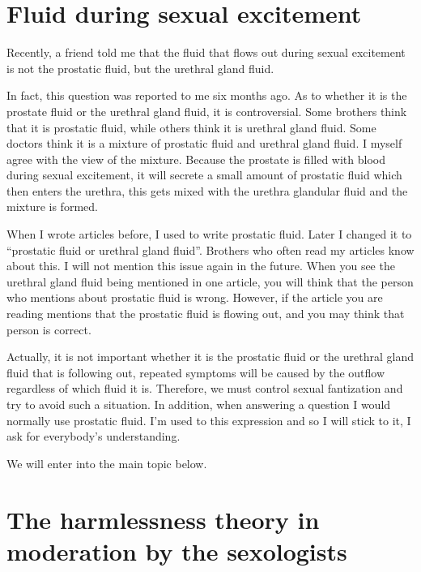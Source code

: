\documentclass[
]{book}
\begin{document}
\hypertarget{fluid-during-sexual-excitement}{%
\section{Fluid during sexual excitement}\label{fluid-during-sexual-excitement}}

Recently, a friend told me that the fluid that flows out during sexual excitement is not the prostatic fluid, but the urethral gland fluid.

In fact, this question was reported to me six months ago. As to whether it is the prostate fluid or the urethral gland fluid, it is controversial. Some brothers think that it is prostatic fluid, while others think it is urethral gland fluid. Some doctors think it is a mixture of prostatic fluid and urethral gland fluid. I myself agree with the view of the mixture. Because the prostate is filled with blood during sexual excitement, it will secrete a small amount of prostatic fluid which then enters the urethra, this gets mixed with the urethra glandular fluid and the mixture is formed.

When I wrote articles before, I used to write prostatic fluid. Later I changed it to ``prostatic fluid or urethral gland fluid''. Brothers who often read my articles know about this. I will not mention this issue again in the future. When you see the urethral gland fluid being mentioned in one article, you will think that the person who mentions about prostatic fluid is wrong. However, if the article you are reading mentions that the prostatic fluid is flowing out, and you may think that person is correct.

Actually, it is not important whether it is the prostatic fluid or the urethral gland fluid that is following out, repeated symptoms will be caused by the outflow regardless of which fluid it is. Therefore, we must control sexual fantization and try to avoid such a situation. In addition, when answering a question I would normally use prostatic fluid. I'm used to this expression and so I will stick to it, I ask for everybody's understanding.

We will enter into the main topic below.

\hypertarget{the-harmlessness-theory-in-moderation-by-the-sexologists}{%
\section{The harmlessness theory in moderation by the sexologists}\label{the-harmlessness-theory-in-moderation-by-the-sexologists}}
\end{document}
